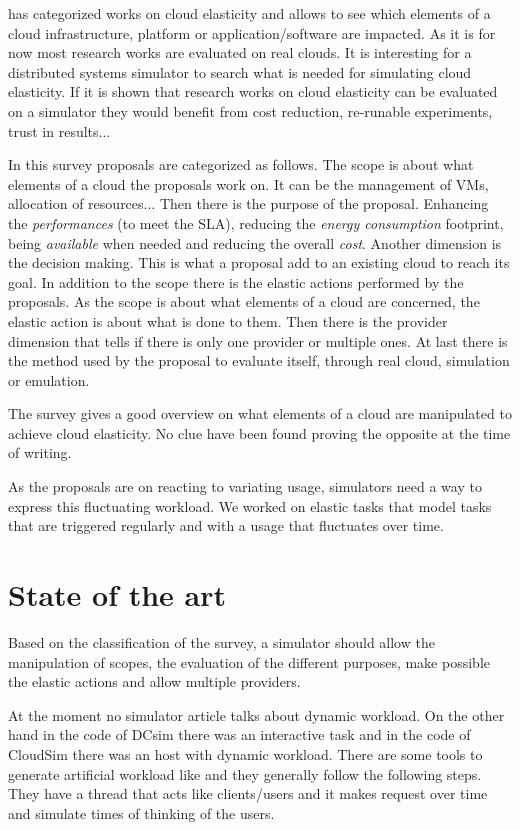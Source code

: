 \documentclass[a4paper, onecolumn]{article}
\begin{document}
  \cite{Naskos2016} has categorized works on cloud elasticity and allows to see
  which elements of a cloud infrastructure, platform or application/software are
  impacted. As it is for now most research works are evaluated on real clouds.
  It is interesting for a distributed systems simulator to search what is needed
  for simulating cloud elasticity. If it is shown that research works on cloud
  elasticity can be evaluated on a simulator they would benefit from cost
  reduction, re-runable experiments, trust in results...
  
  In this survey proposals are categorized as follows. The scope is about what
  elements of a cloud the proposals work on. It can be the management of VMs,
  allocation of resources... Then there is the purpose of the proposal.
  Enhancing the \textit{performances} (to meet the SLA), reducing the
  \textit{energy consumption} footprint, being \textit{available} when needed
  and reducing the overall \textit{cost}. Another dimension is the decision
  making. This is what a proposal add to an existing cloud to reach its goal. In
  addition to the scope there is the elastic actions performed by the proposals.
  As the scope is about what elements of a cloud are concerned, the elastic
  action is about what is done to them. Then there is the provider dimension
  that tells if there is only one provider or multiple ones. At last there is
  the method used by the proposal to evaluate itself, through real cloud,
  simulation or emulation.
  
  The survey gives a good overview on what elements of a cloud are manipulated
  to achieve cloud elasticity. No clue have been found proving the opposite at
  the time of writing.
  
  As the proposals are on reacting to variating usage, simulators need a way to
  express this fluctuating workload. We worked on elastic tasks that model tasks
  that are triggered regularly and with a usage that fluctuates over time.


\section{State of the art} \label{sota}
  Based on the classification of the survey, a simulator should allow the
  manipulation of scopes, the evaluation of the different purposes, make
  possible the elastic actions and allow multiple providers.
  
  At the moment no simulator article talks about dynamic workload. On the other
  hand in the code of DCsim \cite{tighe2013towards} there was an interactive
  task and in the code of CloudSim \cite{calheiros2011cloudsim} there was an
  host with dynamic workload. There are some tools to generate artificial
  workload like \cite{bodik2010characterizing} and they generally follow the
  following steps. They have a thread that acts like clients/users and it makes
  request over time and simulate times of thinking of the users.
  
\end{document}
